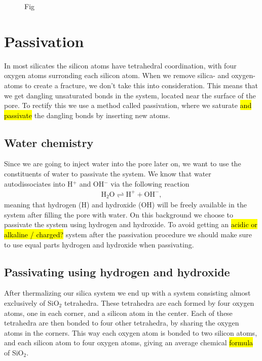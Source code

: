 \begin{figure}[htpb]
\begin{subfigure}[c]{0.45\textwidth}
        \caption{}%
    \end{subfigure}%
    \caption{%
        Fig%
        \label{fig:melted_glass}%
    }%
\end{figure}%

\section{Passivation}
In most silicates the silicon atoms have tetrahedral coordination, with four oxygen atoms surronding each silicon atom. When we remove silica- and oxygen-atoms to create a fracture, we don't take this into consideration. This means that we get dangling unsaturated bonds in the system, located near the surface of the pore. To rectify this we use a method called passivation, where we saturate \hl{and passivate} the dangling bonds by inserting new atoms. 

\subsection{Water chemistry}
Since we are going to inject water into the pore later on, we want to use the constituents of water to passivate the system. We know that water autodissociates into H$^{+}$ and OH$^{-}$ via the following reaction
\begin{align*}
    \text{H}_2\text{O} \rightleftharpoons \text{H}^{+} + \text{OH}^{-},
\end{align*}
meaning that hydrogen (H) and hydroxide (OH) will be freely available in the system after filling the pore with water. On this background we choose to passivate the system using hydrogen and hydroxide. To avoid getting an \hl{acidic or alkaline / charged?} system after the passivation procedure we should make sure to use equal parts hydrogen and hydroxide when passivating.

\subsection{Passivating using hydrogen and hydroxide}
After thermalizing our silica system we end up with a system consisting almost exclusively of SiO$_2$ tetrahedra. These tetrahedra are each formed by four oxygen atoms, one in each corner, and a silicon atom in the center. Each of these tetrahedra are then bonded to four other tetrahedra, by sharing the oxygen atoms in the corners. This way each oxygen atom is bonded to two silicon atoms, and each silicon atom to four oxygen atoms, giving an average chemical \hl{formula} of SiO$_2$. 

